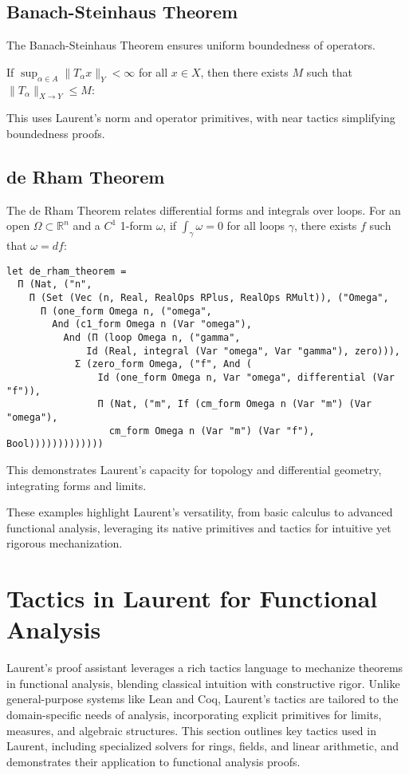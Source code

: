 \documentclass[12pt,twoside,draft]{cmpart}
\begin{document}
\subsection{Banach-Steinhaus Theorem}
The Banach-Steinhaus Theorem ensures uniform boundedness of operators.

If $\sup_{\alpha \in A} \|T_\alpha x\|_Y < \infty$ for all $x \in X$, then there exists $M$ such that $\|T_\alpha\|_{X \to Y} \leq M$:

This uses Laurent’s norm and operator primitives, with near tactics simplifying boundedness proofs.

\subsection{de Rham Theorem}
The de Rham Theorem relates differential forms and integrals over loops. For an open $\Omega \subset \mathbb{R}^n$ and a $C^1$ 1-form $\omega$, if $\int_\gamma \omega = 0$ for all loops $\gamma$, there exists $f$ such that $\omega = df$:
\begin{verbatim}
let de_rham_theorem =
  Π (Nat, ("n",
    Π (Set (Vec (n, Real, RealOps RPlus, RealOps RMult)), ("Omega",
      Π (one_form Omega n, ("omega",
        And (c1_form Omega n (Var "omega"),
          And (Π (loop Omega n, ("gamma",
              Id (Real, integral (Var "omega", Var "gamma"), zero))),
            Σ (zero_form Omega, ("f", And (
                Id (one_form Omega n, Var "omega", differential (Var "f")),
                Π (Nat, ("m", If (cm_form Omega n (Var "m") (Var "omega"),
                  cm_form Omega n (Var "m") (Var "f"), Bool)))))))))))))
\end{verbatim}
This demonstrates Laurent’s capacity for topology and differential geometry, integrating forms and limits.

These examples highlight Laurent’s versatility, from basic calculus to advanced functional analysis, leveraging its native primitives and tactics for intuitive yet rigorous mechanization.

\section{Tactics in Laurent for Functional Analysis}
Laurent’s proof assistant leverages a rich tactics language to mechanize theorems in functional analysis, blending classical intuition with constructive rigor. Unlike general-purpose systems like Lean and Coq, Laurent’s tactics are tailored to the domain-specific needs of analysis, incorporating explicit primitives for limits, measures, and algebraic structures. This section outlines key tactics used in Laurent, including specialized solvers for rings, fields, and linear arithmetic, and demonstrates their application to functional analysis proofs.
\end{document}
